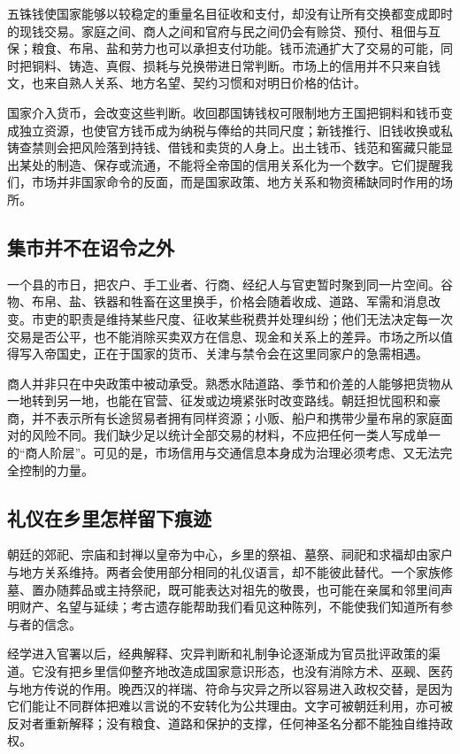 五铢钱使国家能够以较稳定的重量名目征收和支付，却没有让所有交换都变成即时的现钱交易。家庭之间、商人之间和官府与民之间仍会有赊贷、预付、租佃与互保；粮食、布帛、盐和劳力也可以承担支付功能。钱币流通扩大了交易的可能，同时把铜料、铸造、真假、损耗与兑换带进日常判断。市场上的信用并不只来自钱文，也来自熟人关系、地方名望、契约习惯和对明日价格的估计。

国家介入货币，会改变这些判断。收回郡国铸钱权可限制地方王国把铜料和钱币变成独立资源，也使官方钱币成为纳税与俸给的共同尺度；新钱推行、旧钱收换或私铸查禁则会把风险落到持钱、借钱和卖货的人身上。出土钱币、钱范和窖藏只能显出某处的制造、保存或流通，不能将全帝国的信用关系化为一个数字。它们提醒我们，市场并非国家命令的反面，而是国家政策、地方关系和物资稀缺同时作用的场所。

\subsection{集市并不在诏令之外}

一个县的市日，把农户、手工业者、行商、经纪人与官吏暂时聚到同一片空间。谷物、布帛、盐、铁器和牲畜在这里换手，价格会随着收成、道路、军需和消息改变。市吏的职责是维持某些尺度、征收某些税费并处理纠纷；他们无法决定每一次交易是否公平，也不能消除买卖双方在信息、现金和关系上的差异。市场之所以值得写入帝国史，正在于国家的货币、关津与禁令会在这里同家户的急需相遇。

商人并非只在中央政策中被动承受。熟悉水陆道路、季节和价差的人能够把货物从一地转到另一地，也能在官营、征发或边境紧张时改变路线。朝廷担忧囤积和豪商，并不表示所有长途贸易者拥有同样资源；小贩、船户和携带少量布帛的家庭面对的风险不同。我们缺少足以统计全部交易的材料，不应把任何一类人写成单一的“商人阶层”。可见的是，市场信用与交通信息本身成为治理必须考虑、又无法完全控制的力量。

\subsection{礼仪在乡里怎样留下痕迹}

朝廷的郊祀、宗庙和封禅以皇帝为中心，乡里的祭祖、墓祭、祠祀和求福却由家户与地方关系维持。两者会使用部分相同的礼仪语言，却不能彼此替代。一个家族修墓、置办随葬品或主持祭祀，既可能表达对祖先的敬畏，也可能在亲属和邻里间声明财产、名望与延续；考古遗存能帮助我们看见这种陈列，不能使我们知道所有参与者的信念。

经学进入官署以后，经典解释、灾异判断和礼制争论逐渐成为官员批评政策的渠道。它没有把乡里信仰整齐地改造成国家意识形态，也没有消除方术、巫觋、医药与地方传说的作用。晚西汉的祥瑞、符命与灾异之所以容易进入政权交替，是因为它们能让不同群体把难以言说的不安转化为公共理由。文字可被朝廷利用，亦可被反对者重新解释；没有粮食、道路和保护的支撑，任何神圣名分都不能独自维持政权。
